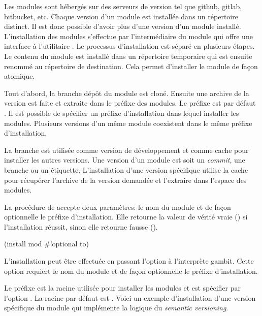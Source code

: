 


Les modules sont hébergés sur des serveurs de version tel que github, gitlab,
bitbucket, etc. Chaque version d'un module est installée dans un répertoire
distinct. Il est donc possible d'avoir plus d'une version d'un module installé.
L'installation des modules s'effectue par l'intermédiaire du module
 qui offre une interface à l'utilitaire . Le
processus d'installation est séparé en plusieurs étapes.  Le contenu du module
est installé dans un répertoire temporaire qui est ensuite renommé au
répertoire de destination. Cela permet d'installer le module de façon atomique.

Tout d'abord, la
branche  dépôt du module est cloné. Ensuite une archive de la
version est faite et extraite dans le préfixe des modules. Le préfixe est par
défaut .  Il est possible de spécifier un préfixe
d'installation dans lequel installer les modules. Plusieurs versions d'un même
module coexistent dans le même préfixe d'installation.

La branche  est utilisée comme version de développement et
comme cache pour installer les autres versions. Une version d'un module est soit
un \textit{commit}, une branche ou un étiquette. L'installation d'une version
spécifique utilise la cache pour récupérer l'archive de la version demandée
et l'extraire dans l'espace des modules.

La procédure  de  accepte deux paramètres:
le nom du module et de façon optionnelle le préfixe d'installation. Elle
retourne la valeur de vérité vraie () si l'installation réussit,
sinon elle retourne fausse ().
\begin{center}
  \begin{mplisting}{0.4}
(install mod #!optional to)
\end{mplisting}
\end{center}

L'installation peut être effectuée en passant l'option 
à l'interprète gambit. Cette option requiert le nom du module et
de façon optionnelle le préfixe d'installation.
\begin{center}
\end{center}
Le préfixe  est la racine utilisée pour installer les modules
et est spécifier par l'option .  La racine par défaut est
. Voici un exemple d'installation d'une version spécifique du module
 qui implémente la logique du \textit{semantic versioning}.

